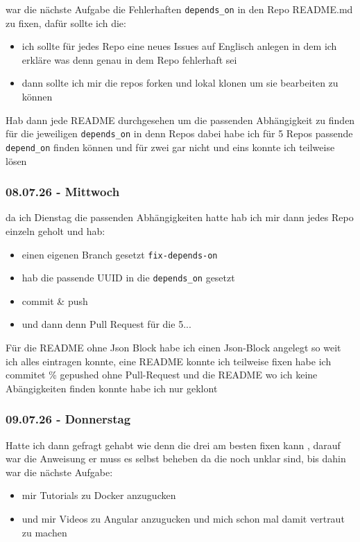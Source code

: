 war die nächste Aufgabe die Fehlerhaften \texttt{depends\_on} in den Repo README.md zu fixen, dafür sollte ich die:

\begin{itemize}
  \item ich sollte für jedes Repo eine neues Issues auf Englisch anlegen in dem ich erkläre was denn genau in dem Repo fehlerhaft sei
  \item dann sollte ich mir die repos forken und lokal klonen um sie bearbeiten zu können
\end{itemize}

Hab dann jede README durchgesehen um die passenden  Abhängigkeit zu finden für die jeweiligen \texttt{depends\_on} in denn Repos dabei habe ich für 5 Repos passende \texttt{depend\_on} finden können und für zwei gar nicht und eins konnte ich teilweise lösen

\subsubsection{08.07.26 - Mittwoch}

da ich Dienstag die passenden Abhängigkeiten hatte hab ich mir dann jedes Repo einzeln geholt und hab:

\begin{itemize}
  \item einen eigenen Branch gesetzt \texttt{fix-depends-on}
  \item hab die passende UUID in die \texttt{depends\_on} gesetzt 
  \item commit \& push
  \item und dann denn Pull Request für die 5...
\end{itemize}

Für die README ohne Json Block habe ich einen Json-Block angelegt so weit ich alles eintragen konnte, eine README konnte ich teilweise fixen habe ich commitet \% gepushed ohne Pull-Request und die README wo ich keine Abängigkeiten finden konnte habe ich nur geklont

\subsubsection{09.07.26 - Donnerstag}

Hatte ich dann gefragt gehabt wie denn die drei am besten fixen kann , darauf war die Anweisung er muss es selbst beheben da die noch unklar sind, bis dahin war die nächste Aufgabe:

\begin{itemize}
  \item mir Tutorials zu Docker anzugucken 
  \item und mir Videos zu Angular anzugucken und mich schon mal damit vertraut zu machen  
\end{itemize}

